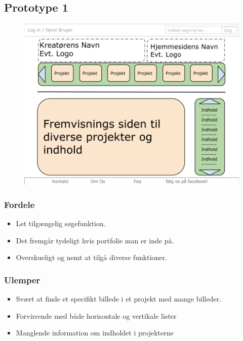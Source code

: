 \documentclass[a4paper,titlepage,fleqn,12pt]{article}
\begin{document}
\subsection{Prototype 1}

\begin{figure}[H]
\includegraphics[width=\textwidth]{hjemmesidedesign1.png}

\end{figure}

\subsubsection{Fordele}

\begin{itemize}
\item Let tilgængelig søgefunktion.
\item Det fremgår tydeligt hvis portfolie man er inde på.
\item Overskueligt og nemt at tilgå diverse funktioner.
\end{itemize}

\subsubsection{Ulemper}
\begin{itemize}
\item Svært at finde et specifikt billede i et projekt med mange billeder. 
\item Forvirrende med både horisontale og vertikale lister
\item Manglende information om indholdet i projekterne
\end{itemize}
\end{document}
